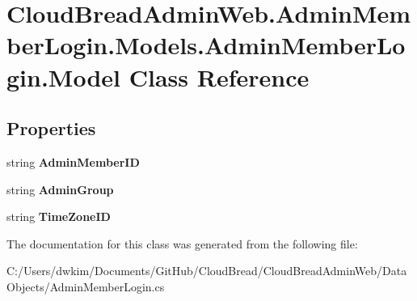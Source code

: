 \hypertarget{a00152}{}\section{Cloud\+Bread\+Admin\+Web.\+Admin\+Member\+Login.\+Models.\+Admin\+Member\+Login.\+Model Class Reference}
\label{a00152}
\subsection*{Properties}
\begin{DoxyCompactItemize}
\item 
string {\bfseries Admin\+Member\+ID}\hypertarget{a00152_a359d7323a7f6f60b67c8cfdb6c209518}{}\label{a00152_a359d7323a7f6f60b67c8cfdb6c209518}

\item 
string {\bfseries Admin\+Group}\hypertarget{a00152_a009a613167b733fd46fc4ed132b3a1b1}{}\label{a00152_a009a613167b733fd46fc4ed132b3a1b1}

\item 
string {\bfseries Time\+Zone\+ID}\hypertarget{a00152_a693f75b7f2dcccd154d9e0c1f275023e}{}\label{a00152_a693f75b7f2dcccd154d9e0c1f275023e}

\end{DoxyCompactItemize}


The documentation for this class was generated from the following file\+:\begin{DoxyCompactItemize}
\item 
C\+:/\+Users/dwkim/\+Documents/\+Git\+Hub/\+Cloud\+Bread/\+Cloud\+Bread\+Admin\+Web/\+Data\+Objects/Admin\+Member\+Login.\+cs\end{DoxyCompactItemize}
